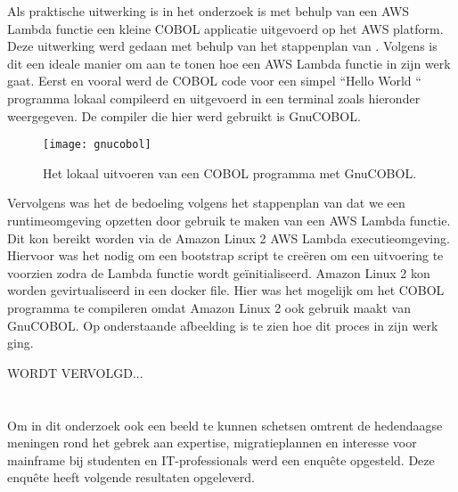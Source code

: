 Als praktische uitwerking is in het onderzoek is met behulp van een AWS Lambda functie een kleine COBOL applicatie uitgevoerd op het AWS platform. Deze uitwerking werd gedaan met behulp van het stappenplan van \textcite{Paika2020}. Volgens \textcite{Paika2020} is dit een ideale manier om aan te tonen hoe een AWS Lambda functie in zijn werk gaat. Eerst en vooral werd de COBOL code voor een simpel ``Hello World `` programma lokaal compileerd en uitgevoerd in een terminal zoals hieronder weergegeven. De compiler die hier werd gebruikt is GnuCOBOL.  
    \begin{figure}[h]
        \centering
        \texttt{[image: gnucobol]}
        \caption{Het lokaal uitvoeren van een COBOL programma met GnuCOBOL.}
     \end{figure}
 
 Vervolgens was het de bedoeling volgens het stappenplan van \textcite{Paika2020} dat we een runtimeomgeving opzetten door gebruik te maken van een AWS Lambda functie. Dit kon bereikt worden via de Amazon Linux 2 AWS Lambda executieomgeving. Hiervoor was het nodig om een bootstrap script te creëren om een uitvoering te voorzien zodra de Lambda functie wordt geïnitialiseerd. Amazon Linux 2 kon worden gevirtualiseerd in een docker file. Hier was het mogelijk om het COBOL programma te compileren omdat Amazon Linux 2 ook gebruik maakt van GnuCOBOL. Op onderstaande afbeelding is te zien hoe dit proces in zijn werk ging. 
 
 WORDT VERVOLGD...
 
 \newpage
 
 \section{}
 \label{sec:De resultaten van de bevraging}
 
 Om in dit onderzoek ook een beeld te kunnen schetsen omtrent de hedendaagse meningen rond het gebrek aan expertise, migratieplannen en interesse voor mainframe bij studenten en IT-professionals werd een enquête opgesteld. Deze enquête heeft volgende resultaten opgeleverd.
 
  \subsection{}
 \label{sec:De resultaten van de bevraging}


